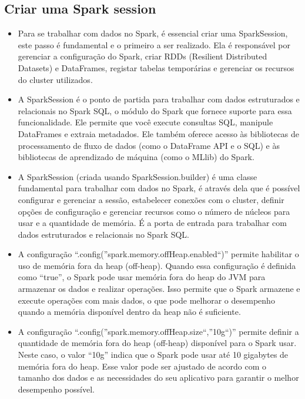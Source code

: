 \documentclass[11pt]{article}
\begin{document}
\hypertarget{Criar uma Spark session}{%
\subsection{Criar uma Spark session}
\label{Criar uma Spark session}}
\begin{itemize}
\item
    Para se trabalhar com dados no Spark, é
    essencial criar uma SparkSession, este passo é fundamental e o primeiro
    a ser realizado. Ela é responsável por gerenciar a configuração do
    Spark, criar RDDs (Resilient Distributed Datasets) e DataFrames,
    registar tabelas temporárias e gerenciar os recursos do cluster
    utilizados.
\item
  A SparkSession é o ponto de partida para trabalhar com dados
  estruturados e relacionais no Spark SQL, o módulo do Spark que fornece
  suporte para essa funcionalidade. Ele permite que você execute
  consultas SQL, manipule DataFrames e extraia metadados. Ele também
  oferece acesso às bibliotecas de processamento de fluxo de dados (como
  o DataFrame API e o SQL) e às bibliotecas de aprendizado de máquina
  (como o MLlib) do Spark.
\item
  A SparkSession (criada usando SparkSession.builder) é uma classe
  fundamental para trabalhar com dados no Spark, é através dela que é
  possível configurar e gerenciar a sessão, estabelecer conexões com o
  cluster, definir opções de configuração e gerenciar recursos como o
  número de núcleos para usar e a quantidade de memória. É a porta de
  entrada para trabalhar com dados estruturados e relacionais no Spark
  SQL.
\item
  A configuração ``.config(''spark.memory.offHeap.enabled``)'' permite
  habilitar o uso de memória fora da heap (off-heap). Quando essa
  configuração é definida como ``true'', o Spark pode usar memória fora
  do heap do JVM para armazenar os dados e realizar operações. Isso
  permite que o Spark armazene e execute operações com mais dados, o que
  pode melhorar o desempenho quando a memória disponível dentro da heap
  não é suficiente.
\item
  A configuração ``.config(''spark.memory.offHeap.size``,''10g``)''
  permite definir a quantidade de memória fora do heap (off-heap)
  disponível para o Spark usar. Neste caso, o valor ``10g'' indica que o
  Spark pode usar até 10 gigabytes de memória fora do heap. Esse valor
  pode ser ajustado de acordo com o tamanho dos dados e as necessidades
  do seu aplicativo para garantir o melhor desempenho possível.
\end{itemize}
\end{document}
